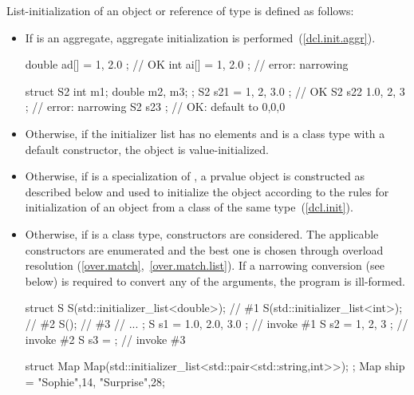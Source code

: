 \pnum
List-initialization of an object or reference of type  is defined as follows:
\begin{itemize}
\item If  is an aggregate, aggregate initialization is
performed~(\ref{dcl.init.aggr}).

\enterexample
\begin{codeblock}
double ad[] = { 1, 2.0 };           // OK
int ai[] = { 1, 2.0 };              // error: narrowing

struct S2 {
  int m1;
  double m2, m3;
};
S2 s21 = { 1, 2, 3.0 };             // OK
S2 s22 { 1.0, 2, 3 };               // error: narrowing
S2 s23 { };                         // OK: default to 0,0,0
\end{codeblock}
\exitexample

\item Otherwise, if the initializer list has no elements and  is a class type with a
default constructor, the object is value-initialized.

\item Otherwise, if  is a specialization of ,
a prvalue  object is constructed as described below and used to
initialize the object according to the rules for initialization of an object from a
class of the same type~(\ref{dcl.init}).

\item Otherwise, if  is a class type, constructors are considered.
The applicable constructors are enumerated and
the best one is chosen through overload resolution (\ref{over.match},~\ref{over.match.list}). If a narrowing
conversion (see below) is required to convert any of the arguments, the program is
ill-formed.

\enterexample
\begin{codeblock}
struct S {
  S(std::initializer_list<double>); // \#1
  S(std::initializer_list<int>);    // \#2
  S();                              // \#3
  // ...
};
S s1 = { 1.0, 2.0, 3.0 };           // invoke \#1
S s2 = { 1, 2, 3 };                 // invoke \#2
S s3 = { };                         // invoke \#3
\end{codeblock}
\exitexample

\enterexample
\begin{codeblock}
struct Map {
  Map(std::initializer_list<std::pair<std::string,int>>);
};
Map ship = {{"Sophie",14}, {"Surprise",28}};
\end{codeblock}
\exitexample


\end{itemize}
